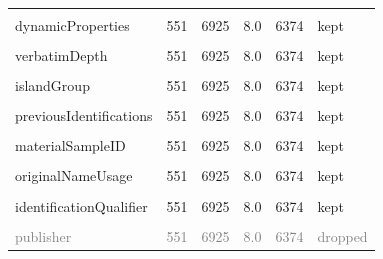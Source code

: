 \documentclass[sn-apa,pdflatex]{sn-jnl}
\begin{document}
\begin{longtable}[t]{lrrrrl}
\cellcolor{gray!10}{georeferenceSources} & \cellcolor{gray!10}{551} & \cellcolor{gray!10}{6925} & \cellcolor{gray!10}{8.0} & \cellcolor{gray!10}{6374} & \cellcolor{gray!10}{kept}\\
dynamicProperties & 551 & 6925 & 8.0 & 6374 & kept\\
\cellcolor{gray!10}{island} & \cellcolor{gray!10}{551} & \cellcolor{gray!10}{6925} & \cellcolor{gray!10}{8.0} & \cellcolor{gray!10}{6374} & \cellcolor{gray!10}{kept}\\
verbatimDepth & 551 & 6925 & 8.0 & 6374 & kept\\
\addlinespace
\cellcolor{gray!10}{footprintWKT} & \cellcolor{gray!10}{551} & \cellcolor{gray!10}{6925} & \cellcolor{gray!10}{8.0} & \cellcolor{gray!10}{6374} & \cellcolor{gray!10}{kept}\\
islandGroup & 551 & 6925 & 8.0 & 6374 & kept\\
\cellcolor{gray!10}{identificationRemarks} & \cellcolor{gray!10}{551} & \cellcolor{gray!10}{6925} & \cellcolor{gray!10}{8.0} & \cellcolor{gray!10}{6374} & \cellcolor{gray!10}{kept}\\
previousIdentifications & 551 & 6925 & 8.0 & 6374 & kept\\
\cellcolor{gray!10}{infraspecificEpithet} & \cellcolor{gray!10}{551} & \cellcolor{gray!10}{6925} & \cellcolor{gray!10}{8.0} & \cellcolor{gray!10}{6374} & \cellcolor{gray!10}{kept}\\
\addlinespace
materialSampleID & 551 & 6925 & 8.0 & 6374 & kept\\
\cellcolor{gray!10}{scientificNameID} & \cellcolor{gray!10}{551} & \cellcolor{gray!10}{6925} & \cellcolor{gray!10}{8.0} & \cellcolor{gray!10}{6374} & \cellcolor{gray!10}{kept}\\
originalNameUsage & 551 & 6925 & 8.0 & 6374 & kept\\
\cellcolor{gray!10}{associatedSequences} & \cellcolor{gray!10}{551} & \cellcolor{gray!10}{6925} & \cellcolor{gray!10}{8.0} & \cellcolor{gray!10}{6374} & \cellcolor{gray!10}{kept}\\
identificationQualifier & 551 & 6925 & 8.0 & 6374 & kept\\
\addlinespace
\cellcolor{gray!10}{gbifID} & \cellcolor{gray!10}{551} & \cellcolor{gray!10}{6925} & \cellcolor{gray!10}{8.0} & \cellcolor{gray!10}{6374} & \cellcolor{gray!10}{kept}\\
\textcolor{gray}{publisher} & \textcolor{gray}{551} & \textcolor{gray}{6925} & \textcolor{gray}{8.0} & \textcolor{gray}{6374} & \textcolor{gray}{dropped}\\

\end{longtable}
\end{document}
